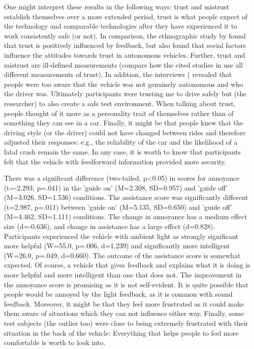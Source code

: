 One might interpret these results in the following ways: trust and mistrust establish themselves over a more extended period, trust is what people expect of the technology and comparable technologies after they have experienced it to work consistently safe (or not). In comparison, the ethnographic study by \cite{Lee2016} found that trust is positively influenced by feedback, but also found that social factors influence the attitudes towards trust in autonomous vehicles. Further, trust and mistrust are ill-defined measurements (compare how the cited studies in \emph{} use all different measurements of trust). In addition, the interviews (\emph{} revealed that people were too aware that the vehicle was not genuinely autonomous and who the driver was. Ultimately participants were trusting me to drive safely but (the researcher) to also create a safe test environment. When talking about trust, people thought of it more as a personality trait of themselves rather than of something they can see in a car. Finally, it might be that people knew that the driving style (or the driver) could not have changed between rides and therefore adjusted their responses: e.g., the reliability of the car and the likelihood of a fatal crash remain the same. In any case, it is worth to know that participants felt that the vehicle with feedforward information provided more security. %

There was a significant difference (two-tailed, p<0.05) in scores for annoyance (t=-2.293, p=.041) in the 'guide on' (M=2.308, SD=0.957) and 'guide off' (M=3.026, SD=1.536) conditions. 
The assistance score was significantly different (t=2.987, p=.011) between 'guide on' (M=5.135, SD=0.650) and 'guide off' (M=4.462, SD=1.111) conditions. The change in annoyance has a medium effect size (d=-0.636), and change in assistance has a large effect (d=0.828). Participants experienced the vehicle with ambient light as strongly significant more helpful (W=55.0, p=.006, d=1.239) and significantly more intelligent (W=26.0, p=.049, d=0.660). The outcome of the assistance score is somewhat expected. Of course, a vehicle that gives feedback and explains what it is doing is more helpful and more intelligent than one that does not. The improvement in the annoyance score is promising as it is not self-evident. It is quite possible that people would be annoyed by the light feedback, as it is common with sound feedback. Moreover, it might be that they feel more frustrated as it could make them aware of situations which they can not influence either way. Finally, some test subjects (the outlier too) were close to being extremely frustrated with their situation in the back of the vehicle: Everything that helps people to feel more comfortable is worth to look into. 

